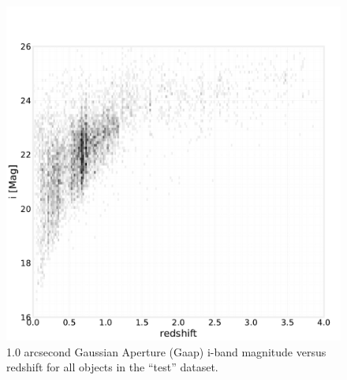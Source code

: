 \begin{figure}
    \centering
    \includegraphics[width=\linewidth]{figures/mag_i_v_redshift.pdf}
    \caption{1.0 arcsecond Gaussian Aperture (Gaap) i-band magnitude versus redshift for all objects in the ``test'' dataset.}
    \label{fig:dp_mag_i_v_redshift}
\end{figure}

